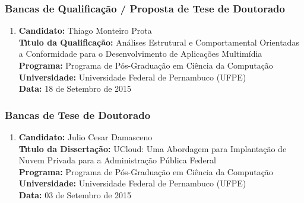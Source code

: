 \documentclass[a4paper,oneside,10pt]{article}
\begin{document}

\subsubsection{Bancas de Qualifica\c{c}\~ao / Proposta de Tese de Doutorado}
\vspace{0.3cm}

\begin{enumerate}
\renewcommand{\labelenumi}{{\large\bfseries\arabic{enumi}.}}
\vspace{0.3cm}

\item       \textbf{Candidato:} Thiago Monteiro Prota \mbox{} \\
            \textbf{T\'{\i}tulo da Qualifica\c{c}\~{a}o:} Análises Estrutural e Comportamental Orientadas a Conformidade para o Desenvolvimento de Aplicações Multimídia\\
            \textbf{Programa:} Programa de Pós-Graduação em Ciência da Computação\\
            \textbf{Universidade:} Universidade Federal de Pernambuco (UFPE)\\
            \textbf{Data:} 18 de Setembro de 2015

\end{enumerate}


\subsubsection{Bancas de Tese de Doutorado}

\begin{enumerate}
\renewcommand{\labelenumi}{{\large\bfseries\arabic{enumi}.}}
\vspace{0.3cm}

\item       \textbf{Candidato:} Julio Cesar Damasceno \mbox{} \\
            \textbf{T\'{\i}tulo da Disserta\c{c}\~{a}o:} UCloud: Uma Abordagem para Implantação de Nuvem Privada para a Administração Pública Federal\\
            \textbf{Programa:} Programa de Pós-Graduação em Ciência da Computação\\
            \textbf{Universidade:} Universidade Federal de Pernambuco (UFPE)\\
            \textbf{Data:} 03 de Setembro de 2015

\end{enumerate}
\end{document}
